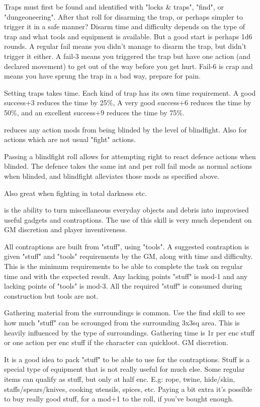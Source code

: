 Traps must first be found and identified with "locks \& traps", "find", or "dungeoneering". After that roll for disarming the trap, or perhaps simpler to trigger it in a safe manner? Disarm time and difficulty depends on the type of trap and what tools and equipment is available. But a good start is perhaps 1d6 rounds.
A regular fail means you didn't manage to disarm the trap, but didn't trigger it either. A fail-3 means you triggered the trap but have one action (and declared movement) to get out of the way before you get hurt. Fail-6 is crap and means you have sprung the trap in a bad way, prepare for pain.

Setting traps takes time. Each kind of trap has its own time requirement. A good success+3 reduces the time by 25\%, A very good success+6 reduces the time by 50\%, and an excellent success+9 reduces the time by 75\%.


 reduces any action mods from being blinded by the level of blindfight. Also for actions which are not usual "fight" actions.

Passing a blindfight roll allows for attempting right to react defence actions when blinded. The defence takes the same int and per roll fail mods as normal actions when blinded, and blindfight alleviates those mods as specified above.

Also great when fighting in total darkness etc.


 is the ability to turn miscellaneous everyday objects and debris into improvised useful gadgets and contraptions. The use of this skill is very much dependent on GM discretion and player inventiveness.

All contraptions are built from "stuff", using "tools". A suggested contraption is given "stuff" and "tools" requirements by the GM, along with time and difficulty. This is the minimum requirements to be able to complete the task on regular time and with the expected result. Any lacking points "stuff" is mod-1 and any lacking points of "tools" is mod-3.
All the required "stuff" is consumed during construction but tools are not.

Gathering material from the surroundings is common. Use the find skill to see how much "stuff" can be scrounged from the surrounding 3x3sq area. This is heavily influenced by the type of surroundings. Gathering time is 1r per enc stuff or one action per enc stuff if the character can quickloot. GM discretion.

It is a good idea to pack "stuff" to be able to use for the contraptions. Stuff is a special type of equipment that is not really useful for much else. Some regular items can qualify as stuff, but only at half enc. E.g: rope, twine, hide/skin, staffs/spears/knives, cooking utensils, spices, etc. Paying a bit extra it's possible to buy really good stuff, for a mod+1 to the roll, if you've bought enough.


